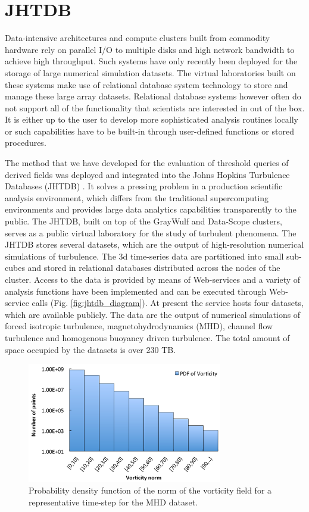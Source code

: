 \documentclass{sig-alternate}
\begin{document}

\section{JHTDB}\label{jhtdb}
Data-intensive architectures and compute clusters built from commodity hardware rely on parallel I/O to multiple disks and high network bandwidth
to achieve high throughput. Such systems have only recently been deployed for the storage of large numerical simulation 
datasets. The virtual laboratories built on these systems make use of relational database system technology to store and manage these large array datasets.
Relational database systems however often do not support
all of the functionality that scientists are interested in out of the box. It is either up to the user to develop more sophisticated analysis routines locally or such
capabilities have to be built-in through user-defined functions or stored procedures. 

The method that we have developed for the evaluation of threshold queries of derived fields was deployed and integrated into the 
Johns Hopkins Turbulence Databases (JHTDB) \cite{Yi, Perlman}. It solves a pressing problem in a production scientific analysis environment, which differs 
from the traditional supercomputing environments and provides large data analytics capabilities transparently to the public. 
The JHTDB, built on top of the GrayWulf and Data-Scope clusters, serves as a public virtual laboratory for
the study of turbulent phenomena. The JHTDB stores several datasets, which are the output of high-resolution numerical simulations of turbulence.
The 3d time-series data are partitioned into small sub-cubes and stored in relational databases distributed across the nodes of the cluster.
Access to the data is provided by means of Web-services and a variety of analysis functions have been
implemented and can be executed through Web-service calls (Fig. \ref{fig:jhtdb_diagram}).
At present the service hosts four datasets, which are available publicly. 
The data are the output of numerical simulations of forced isotropic turbulence, magnetohydrodynamics (MHD), channel 
flow turbulence and homogenous buoyancy driven turbulence.
The total amount of space occupied by the datasets is over 230 TB. 

\begin{figure}
\centering
\includegraphics[width=3.35in]{Figures/pdf.pdf}
\caption{Probability density function of the norm of the vorticity field for a representative time-step for the MHD dataset.}
\label{fig:pdf}
\end{figure}
\end{document}
